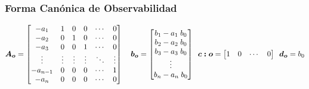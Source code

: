 \subsubsection*{Forma Canónica de Observabilidad}
\begin{equation*}
    \bm{A_o} = 
    \begin{bmatrix}
    -a_1 & 1 & 0 & 0 & \cdots & 0\\
    -a_2 & 0 & 1 & 0 & \cdots & 0\\
    -a_3 & 0 & 0 & 1 & \cdots & 0\\
    \vdots & \vdots & \vdots & \vdots & \ddots & \vdots \\
    -a_{n-1} & 0 & 0 & 0 & \cdots & 1\\
    -a_{n} & 0 & 0 & 0 & \cdots & 0 \\
    \end{bmatrix}
    \hspace*{10pt}
    \bm{b_o} = 
    \begin{bmatrix}
    b_1 - a_1\; b_0 \\
    b_2 - a_2\; b_0 \\
    b_3 - a_3\; b_0 \\
    \vdots \\
    b_n - a_n\; b_0 \\
    \end{bmatrix}
    \hspace*{5pt}
    \bm{c:o} = 
    \begin{bmatrix}
    1 & 0 & \cdots & 0
    \end{bmatrix}
    \hspace*{5pt}
    \bm{d_o} = b_0
\end{equation*}



